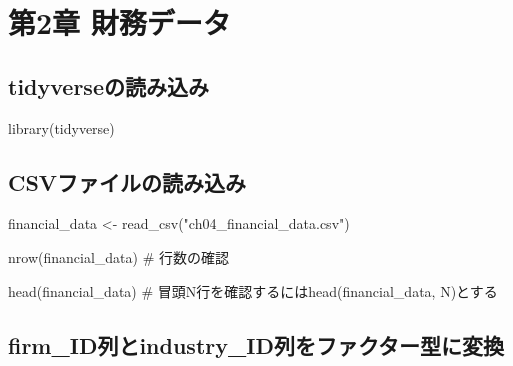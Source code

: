 \documentclass[
  letterpaper,
  DIV=11,
  numbers=noendperiod]{scrreprt}
\newenvironment{Shaded}{\begin{snugshade}}{\end{snugshade}}
\newcommand{\CommentTok}[1]{\textcolor[rgb]{0.37,0.37,0.37}{#1}}
\newcommand{\FunctionTok}[1]{\textcolor[rgb]{0.28,0.35,0.67}{#1}}
\newcommand{\NormalTok}[1]{\textcolor[rgb]{0.00,0.23,0.31}{#1}}
\newcommand{\OtherTok}[1]{\textcolor[rgb]{0.00,0.23,0.31}{#1}}
\newcommand{\SpecialCharTok}[1]{\textcolor[rgb]{0.37,0.37,0.37}{#1}}
\newcommand{\StringTok}[1]{\textcolor[rgb]{0.13,0.47,0.30}{#1}}
\begin{document}
\chapter{第2章
財務データ}\label{ux7b2c2ux7ae0-ux8ca1ux52d9ux30c7ux30fcux30bf}

\section{tidyverseの読み込み}\label{tidyverseux306eux8aadux307fux8fbcux307f-1}

\begin{Shaded}
\begin{Highlighting}[]
\FunctionTok{library}\NormalTok{(tidyverse)}
\end{Highlighting}
\end{Shaded}

\section{CSVファイルの読み込み}\label{csvux30d5ux30a1ux30a4ux30ebux306eux8aadux307fux8fbcux307f-1}

\begin{Shaded}
\begin{Highlighting}[]
\NormalTok{financial\_data }\OtherTok{\textless{}{-}} \FunctionTok{read\_csv}\NormalTok{(}\StringTok{"ch04\_financial\_data.csv"}\NormalTok{)}

\FunctionTok{nrow}\NormalTok{(financial\_data) }\CommentTok{\# 行数の確認}

\FunctionTok{head}\NormalTok{(financial\_data) }\CommentTok{\# 冒頭N行を確認するにはhead(financial\_data, N)とする}
\end{Highlighting}
\end{Shaded}

\section{firm\_ID列とindustry\_ID列をファクター型に変換}\label{firm_idux5217ux3068industry_idux5217ux3092ux30d5ux30a1ux30afux30bfux30fcux578bux306bux5909ux63db}

\begin{Shaded}
\end{Shaded}
\end{document}
